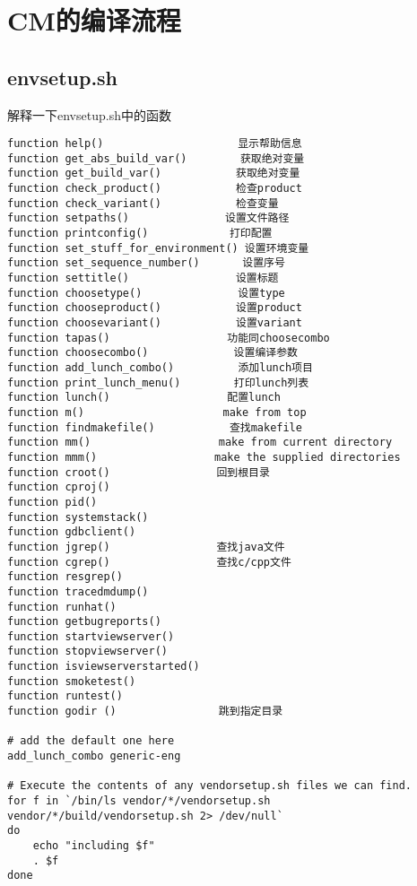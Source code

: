 \documentclass[12pt,a4paper]{article}
\begin{document}
\section{CM的编译流程}

\subsection{envsetup.sh}
解释一下envsetup.sh中的函数 \\
\begin{verbatim}
function help() 　　　　　　　　　　　　显示帮助信息
function get_abs_build_var()　　　　　获取绝对变量
function get_build_var()　　　　　　　获取绝对变量
function check_product()　　　　　　　检查product
function check_variant()　　　　　　　检查变量
function setpaths()　　　　　　　　　设置文件路径
function printconfig()　　　　　　　 打印配置
function set_stuff_for_environment() 设置环境变量
function set_sequence_number()　　　　设置序号
function settitle()　　　　　　　　　　设置标题
function choosetype()　　　　　　　　　设置type
function chooseproduct()　　　　　　　设置product
function choosevariant()　　　　　　　设置variant
function tapas()　　　　　　　　　　　功能同choosecombo
function choosecombo()　　　　　　　　设置编译参数
function add_lunch_combo()　　　　　　添加lunch项目
function print_lunch_menu()　　　　　打印lunch列表
function lunch()　　　　　　　　　　　配置lunch
function m()　　　　　　　　　　　　　make from top
function findmakefile()　　　　　　　查找makefile
function mm()　　　　　　　　　　　　make from current directory
function mmm()　　　　　　　　　　　make the supplied directories
function croot()　　　　　　　　　　回到根目录
function cproj()
function pid()
function systemstack()
function gdbclient()
function jgrep()　　　　　　　　　　查找java文件
function cgrep()　　　　　　　　　　查找c/cpp文件
function resgrep()
function tracedmdump()
function runhat()
function getbugreports()
function startviewserver()
function stopviewserver()
function isviewserverstarted()
function smoketest()
function runtest()
function godir () 　　　　　　　　　跳到指定目录
 
# add the default one here
add_lunch_combo generic-eng
 
# Execute the contents of any vendorsetup.sh files we can find.
for f in `/bin/ls vendor/*/vendorsetup.sh vendor/*/build/vendorsetup.sh 2> /dev/null`
do
    echo "including $f"
    . $f
done
\end{verbatim}
\label{4_1}
\end{document}

